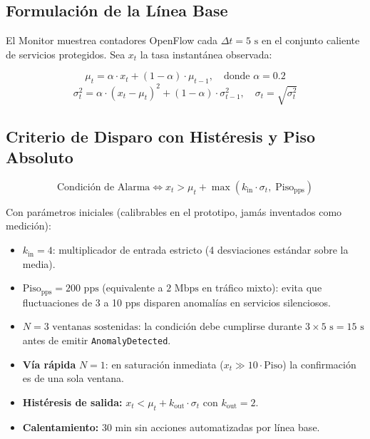 \documentclass[11pt,a4paper]{report}
\begin{document}
\subsection{Formulación de la Línea Base}
El Monitor muestrea contadores OpenFlow cada $\Delta t = 5\text{ s}$ en el conjunto caliente de servicios protegidos. Sea $x_t$ la tasa instantánea observada:

\begin{equation}
\mu_t = \alpha \cdot x_t + (1 - \alpha) \cdot \mu_{t-1}, \quad \text{donde } \alpha = 0.2
\end{equation}
\begin{equation}
\sigma_t^2 = \alpha \cdot (x_t - \mu_t)^2 + (1 - \alpha) \cdot \sigma_{t-1}^2, \quad \sigma_t = \sqrt{\sigma_t^2}
\end{equation}

\subsection{Criterio de Disparo con Histéresis y Piso Absoluto}
\begin{equation}
\text{Condición de Alarma} \iff x_t > \mu_t + \max\left(k_{\text{in}} \cdot \sigma_t, \; \text{Piso}_{\text{pps}}\right)
\end{equation}

Con parámetros iniciales (calibrables en el prototipo, jamás inventados como medición):
\begin{itemize}[leftmargin=*]
    \item $k_{\text{in}} = 4$: multiplicador de entrada estricto (4 desviaciones estándar sobre la media).
    \item $\text{Piso}_{\text{pps}} = 200\text{ pps}$ (equivalente a $2\text{ Mbps}$ en tráfico mixto): evita que fluctuaciones de 3 a 10 pps disparen anomalías en servicios silenciosos.
    \item $N = 3\text{ ventanas sostenidas}$: la condición debe cumplirse durante $3 \times 5\text{ s} = 15\text{ s}$ antes de emitir \texttt{AnomalyDetected}.
    \item \textbf{Vía rápida} $N=1$: en saturación inmediata ($x_t \gg 10 \cdot \text{Piso}$) la confirmación es de una sola ventana.
    \item \textbf{Histéresis de salida:} $x_t < \mu_t + k_{\text{out}} \cdot \sigma_t$ con $k_{\text{out}} = 2$.
    \item \textbf{Calentamiento:} 30 min sin acciones automatizadas por línea base.
\end{itemize}
\end{document}
